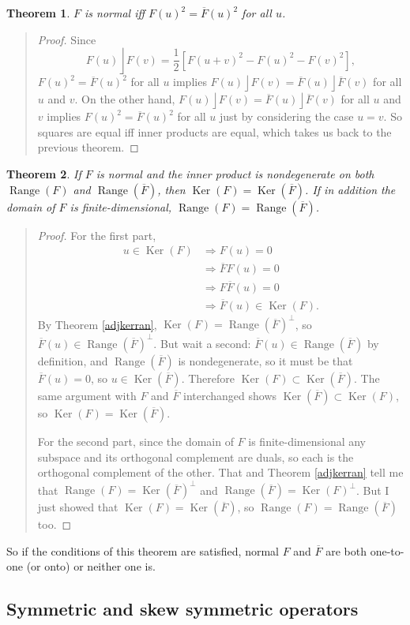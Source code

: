 \documentclass{utarticle}
\DeclareMathOperator{\lin}{\rfloor}
\newcommand{\Ker}{\operatorname{Ker}}
\newcommand{\Range}{\operatorname{Range}}
\newcommand{\adj}[1]{\ensuremath{\overline{#1}}}
\newcommand{\half}{\ensuremath{\frac{1}{2}}}
\newtheorem{thm}{Theorem}
\newcommand{\bp}{\begin{quotation} \begin{proof}}
\newcommand{\ep}{\end{proof} \end{quotation}}
\begin{document}
\begin{thm}
$F$ is normal iff $F(u)^2 = \adj{F}(u)^2$ for all $u$.
\end{thm}
\bp
Since
\begin{equation}
F(u) \lin F(v) = \half\left[F(u+v)^2 - F(u)^2 - F(v)^2\right],
\end{equation}
$F(u)^2 = \adj{F}(u)^2$ for all $u$ implies $F(u) \lin F(v) = \adj{F}(u) \lin \adj{F}(v)$ for all $u$ and $v$.
On the other hand,   $F(u) \lin F(v) = \adj{F}(u) \lin \adj{F}(v)$ for all $u$ and $v$ implies $F(u)^2 = 
\adj{F}(u)^2$ for all $u$ just by considering the case $u=v$.  So squares are equal iff inner products are
equal, which takes us back to the previous theorem. 
\ep
\begin{thm}
If $F$ is normal and the inner product is nondegenerate on both $\Range(F)$ and $\Range(\adj{F})$, 
then $\Ker(F) = \Ker(\adj{F})$.  If in addition the domain of $F$ is finite-dimensional, 
$\Range(F) = \Range(\adj{F})$.
\end{thm}
\bp
For the first part,
\begin{align}
u \in \Ker(F) & \Longrightarrow F(u) = 0 \nonumber \\
                      & \Longrightarrow \adj{F}F(u) = 0 \nonumber \\
                      & \Longrightarrow F\adj{F}(u) = 0 \nonumber \\
                      & \Longrightarrow \adj{F}(u) \in \Ker(F).
\end{align}
By Theorem \ref{adjkerran}, $\Ker(F) = \Range(\adj{F})^\perp$, so $\adj{F}(u) \in \Range(\adj{F})^\perp$.  
But wait a second: $\adj{F}(u) \in \Range(\adj{F})$ by definition, and $\Range(\adj{F})$ is nondegenerate, 
so it must be that $\adj{F}(u) = 0$, so $u \in \Ker(\adj{F})$.  Therefore $\Ker(F) \subset \Ker(\adj{F})$.  
The same argument with $F$ and \adj{F} interchanged shows $\Ker(\adj{F}) \subset \Ker(F)$, so 
$\Ker(F) = \Ker(\adj{F})$.

For the second part, since the domain of $F$ is finite-dimensional  any subspace and its orthogonal
complement are duals, so each is the orthogonal complement of the other.  That and Theorem 
\ref{adjkerran} tell me that  $\Range(F) = \Ker(\adj{F})^\perp$ and $\Range(\adj{F}) = \Ker(F)^\perp$.  But 
I just showed that $\Ker(F) = \Ker(\adj{F})$, so $\Range(F) = \Range(\adj{F})$ too.
\ep
So if the conditions of this theorem are satisfied, normal $F$ and \adj{F} are both one-to-one (or onto) 
or neither one is.

\subsection{Symmetric and skew symmetric operators}
\label{symmskew}
\end{document}
